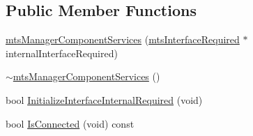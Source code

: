 \subsection*{Public Member Functions}
\begin{DoxyCompactItemize}
\item 
\hyperlink{classmts_manager_component_services_ad96b17a0c6a447b45eabb09dba27ff3b}{mts\-Manager\-Component\-Services} (\hyperlink{classmts_interface_required}{mts\-Interface\-Required} $\ast$internal\-Interface\-Required)
\item 
\hyperlink{classmts_manager_component_services_aa42293f51a7a9f6c40bc0cadc2f3c4cb}{$\sim$mts\-Manager\-Component\-Services} ()
\item 
bool \hyperlink{classmts_manager_component_services_a91a14c8b3c7093aad113a99d8648c58e}{Initialize\-Interface\-Internal\-Required} (void)
\item 
bool \hyperlink{classmts_manager_component_services_acf4e608081b9d7827043c7f0826b3dc3}{Is\-Connected} (void) const 
\end{DoxyCompactItemize}
{\bf }\par

